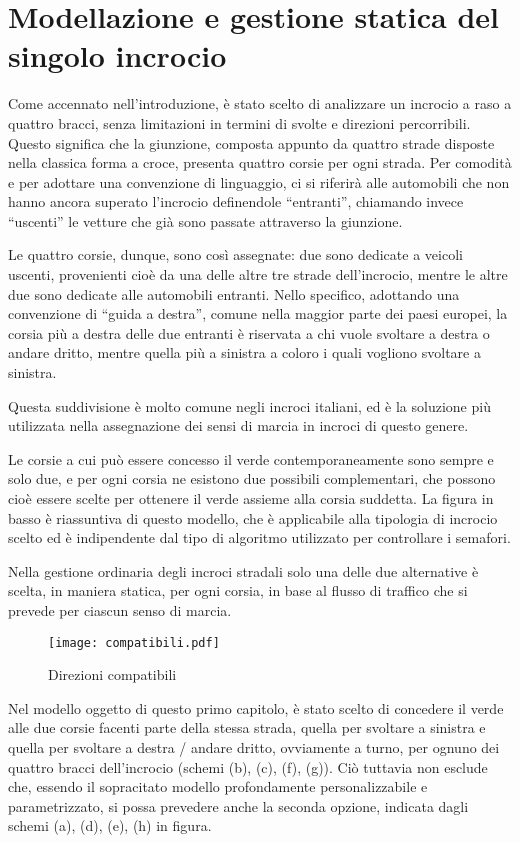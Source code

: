 \chapter{Modellazione e gestione statica del singolo incrocio \label{capitolo1}}
Come accennato nell’introduzione, è stato scelto di analizzare un incrocio a raso a quattro bracci, senza limitazioni in termini di svolte e direzioni percorribili. Questo significa che la giunzione, composta appunto da quattro strade disposte nella classica forma a croce, presenta quattro corsie per ogni strada. Per comodità e per adottare una convenzione di linguaggio, ci si riferirà alle automobili che non hanno ancora superato l’incrocio definendole “entranti”, chiamando invece “uscenti” le vetture che già sono passate attraverso la giunzione.

Le quattro corsie, dunque, sono così assegnate: due sono dedicate a veicoli uscenti, provenienti cioè da una delle altre tre strade dell’incrocio, mentre le altre due sono dedicate alle automobili entranti. Nello specifico, adottando una convenzione di “guida a destra”, comune nella maggior parte dei paesi europei, la corsia più a destra delle due entranti è riservata a chi vuole svoltare a destra o andare dritto, mentre quella più a sinistra a coloro i quali vogliono svoltare a sinistra.

Questa suddivisione è molto comune negli incroci italiani, ed è la soluzione più utilizzata nella assegnazione dei sensi di marcia in incroci di questo genere.

Le corsie a cui può essere concesso il verde contemporaneamente sono sempre e solo due, e per ogni corsia ne esistono due possibili complementari, che possono cioè essere scelte per ottenere il verde assieme alla corsia suddetta. La figura in basso è riassuntiva di questo modello, che è applicabile alla tipologia di incrocio scelto ed è indipendente dal tipo di algoritmo utilizzato per controllare i semafori.

Nella gestione ordinaria degli incroci stradali solo una delle due alternative è scelta, in maniera statica, per ogni corsia, in base al flusso di traffico che si prevede per ciascun senso di marcia.

\begin{figure}[H]
	\centering
	\texttt{[image: compatibili.pdf]}
	\caption{Direzioni compatibili}
	\label{dirCompatibili}
\end{figure}
\label{figure: DirezioniCompatibili}
Nel modello oggetto di questo primo capitolo, è stato scelto di concedere il verde alle due corsie facenti parte della stessa strada, quella per svoltare a sinistra e quella per svoltare a destra / andare dritto, ovviamente a turno, per ognuno dei quattro bracci dell’incrocio (schemi (b), (c), (f), (g)). Ciò tuttavia non esclude che, essendo il sopracitato modello profondamente personalizzabile e parametrizzato, si possa prevedere anche la seconda opzione, indicata dagli schemi (a), (d), (e), (h) in figura.

